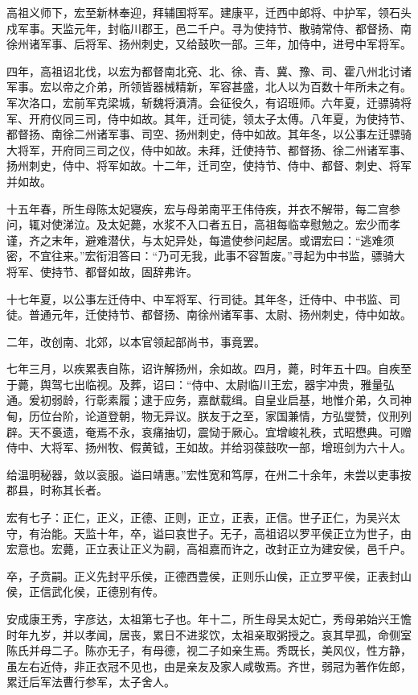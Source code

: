 \documentclass[12pt,UTF8]{ctexbook}
\begin{document}
高祖义师下，宏至新林奉迎，拜辅国将军。建康平，迁西中郎将、中护军，领石头戍军事。天监元年，封临川郡王，邑二千户。寻为使持节、散骑常侍、都督扬、南徐州诸军事、后将军、扬州刺史，又给鼓吹一部。三年，加侍中，进号中军将军。

四年，高祖诏北伐，以宏为都督南北兗、北、徐、青、冀、豫、司、霍八州北讨诸军事。宏以帝之介弟，所领皆器械精新，军容甚盛，北人以为百数十年所未之有。军次洛口，宏前军克梁城，斩魏将濆清。会征役久，有诏班师。六年夏，迁骠骑将军、开府仪同三司，侍中如故。其年，迁司徒，领太子太傅。八年夏，为使持节、都督扬、南徐二州诸军事、司空、扬州刺史，侍中如故。其年冬，以公事左迁骠骑大将军，开府同三司之仪，侍中如故。未拜，迁使持节、都督扬、徐二州诸军事、扬州刺史，侍中、将军如故。十二年，迁司空，使持节、侍中、都督、刺史、将军并如故。

十五年春，所生母陈太妃寝疾，宏与母弟南平王伟侍疾，并衣不解带，每二宫参问，辄对使涕泣。及太妃薨，水浆不入口者五日，高祖每临幸慰勉之。宏少而孝谨，齐之末年，避难潜伏，与太妃异处，每遣使参问起居。或谓宏曰：“逃难须密，不宜往来。”宏衔泪答曰：“乃可无我，此事不容暂废。”寻起为中书监，骠骑大将军、使持节、都督如故，固辞弗许。

十七年夏，以公事左迁侍中、中军将军、行司徒。其年冬，迁侍中、中书监、司徒。普通元年，迁使持节、都督扬、南徐州诸军事、太尉、扬州刺史，侍中如故。

二年，改创南、北郊，以本官领起部尚书，事竟罢。

七年三月，以疾累表自陈，诏许解扬州，余如故。四月，薨，时年五十四。自疾至于薨，舆驾七出临视。及葬，诏曰：“侍中、太尉临川王宏，器宇冲贵，雅量弘通。爰初弱龄，行彰素履；逮于应务，嘉猷载缉。自皇业启基，地惟介弟，久司神甸，历位台阶，论道登朝，物无异议。朕友于之至，家国兼情，方弘燮赞，仪刑列辟。天不裛遗，奄焉不永，哀痛抽切，震恸于厥心。宜增峻礼秩，式昭懋典。可赠侍中、大将军、扬州牧、假黄钺，王如故。并给羽葆鼓吹一部，增班剑为六十人。

给温明秘器，敛以衮服。谥曰靖惠。”宏性宽和笃厚，在州二十余年，未尝以吏事按郡县，时称其长者。

宏有七子：正仁，正义，正德、正则，正立，正表，正信。世子正仁，为吴兴太守，有治能。天监十年，卒，谥曰哀世子。无子，高祖诏以罗平侯正立为世子，由宏意也。宏薨，正立表让正义为嗣，高祖嘉而许之，改封正立为建安侯，邑千户。

卒，子贲嗣。正义先封平乐侯，正德西豊侯，正则乐山侯，正立罗平侯，正表封山侯，正信武化侯，正德别有传。

安成康王秀，字彦达，太祖第七子也。年十二，所生母吴太妃亡，秀母弟始兴王憺时年九岁，并以孝闻，居丧，累日不进浆饮，太祖亲取粥授之。哀其早孤，命侧室陈氏并母二子。陈亦无子，有母德，视二子如亲生焉。秀既长，美风仪，性方静，虽左右近侍，非正衣冠不见也，由是亲友及家人咸敬焉。齐世，弱冠为著作佐郎，累迁后军法曹行参军，太子舍人。
\end{document}
